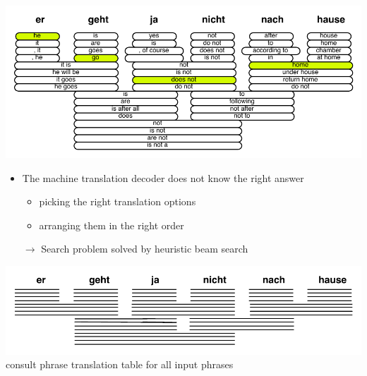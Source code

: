 \documentclass[landscape]{slides}
\begin{document}

\begin{center} 
\includegraphics[scale=1.5]{translation-options-correct.pdf}
\end{center}  \vspace{-10mm}
\begin{itemize}
\item The machine translation decoder does not know the right answer\vspace{-4mm}
\begin{itemize}
\item picking the right translation options
\item arranging them in the right order \vspace{-4mm}
\end{itemize}
\item[$\rightarrow$] Search problem solved by heuristic beam search
\end{itemize}


\begin{center}
\includegraphics[scale=1.3]{decoding-step1.pdf}\\[69mm]
consult phrase translation table for all input phrases
\end{center}

\end{document}
